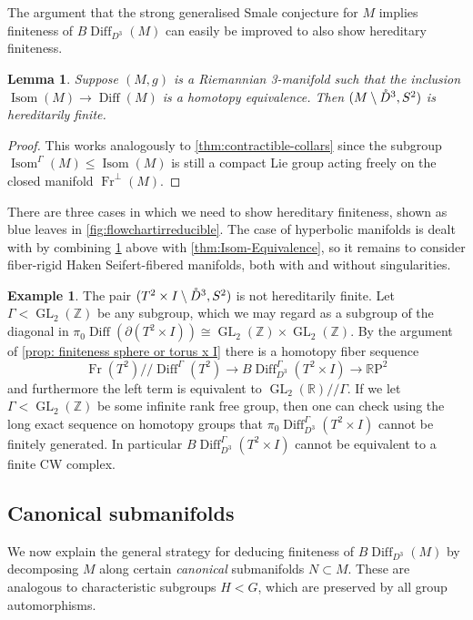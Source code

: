 \documentclass{amsart}
\theoremstyle{plain}
\newtheorem{lem}[thm]{Lemma}
\theoremstyle{definition}
\newtheorem{ex}[thm]{Example}
\DeclareMathOperator\Diff{Diff}
\DeclareMathOperator\Isom{Isom}
\DeclareMathOperator\GL{GL}
\DeclareMathOperator\Fr{Fr}
\newcommand{\interior}[1]{\smash{\mathring{#1}}}
\newcommand{\hq}{/\!\!/} %
\newcommand{\BDiff}{B\!\Diff}
\newcommand{\bbZ}{\mathbb{Z}}
\newcommand{\bbR}{\mathbb{R}}
\newcommand{\RP}{\mathbb{R}\mathrm{P}}
\begin{document}
The argument that the strong generalised Smale conjecture for $M$ implies finiteness of $\BDiff_{D^3}(M)$ can easily be improved to also show hereditary finiteness.
\begin{lem}\label{lem:Riemannian-hereditarily-finite}
    Suppose $(M,g)$ is a Riemannian 3-manifold such that the inclusion $\Isom(M)\rightarrow \Diff(M) $ is a homotopy equivalence.
    Then $(M \setminus \interior{D}^3, S^2)$ is hereditarily finite.
\end{lem}
\begin{proof} 
    This works analogously to \cref{thm:contractible-collars} since the subgroup $\Isom^\Gamma(M) \le \Isom(M)$ is still a compact Lie group acting freely on the closed manifold $\Fr^\perp(M)$.
\end{proof}



There are three cases in which we need to show hereditary finiteness, shown as blue leaves in \cref{fig:flowchartirreducible}.
The case of hyperbolic manifolds is dealt with by combining \cref{lem:Riemannian-hereditarily-finite} above with \cref{thm:Isom-Equivalence},
so it remains to consider fiber-rigid Haken Seifert-fibered  manifolds, both with and without singularities.


\begin{ex}\label{ex:not-hereditarily-finite}
    The pair $(T^2 \times I\setminus \interior{D}^3, S^2)$ is not hereditarily finite.
    Let $\Gamma < \GL_2(\bbZ)$ be any subgroup, which we may regard as a  subgroup of the diagonal in $\pi_0 \Diff(\partial (T^2 \times I)) \cong \GL_2(\bbZ) \times \GL_2(\bbZ)$.
    By the argument of \cref{prop: finiteness sphere or torus x I} there is a homotopy fiber sequence
    \[
        \Fr(T^2)\hq \Diff^\Gamma(T^2) \longrightarrow
        \BDiff_{D^3}^\Gamma(T^2 \times I) \longrightarrow \RP^2
    \]
    and furthermore the left term is equivalent to $\GL_2(\bbR) \hq \Gamma$.
    If we let $\Gamma < \GL_2(\bbZ)$ be some infinite rank free group, then one can check using the long exact sequence on homotopy groups that $\pi_0 \Diff_{D^3}^\Gamma(T^2 \times I)$ cannot be finitely generated.
    In particular $\BDiff_{D^3}^\Gamma(T^2 \times I)$ cannot be equivalent to a finite CW complex.
\end{ex}


\subsection{Canonical submanifolds}\label{subsec:canonical}
We now explain the general strategy for deducing finiteness of $\BDiff_{D^3}(M)$ by decomposing $M$ along certain \emph{canonical} submanifolds $N \subset M$.
These are analogous to characteristic subgroups $H < G$, which are preserved by all group automorphisms.
\end{document}
